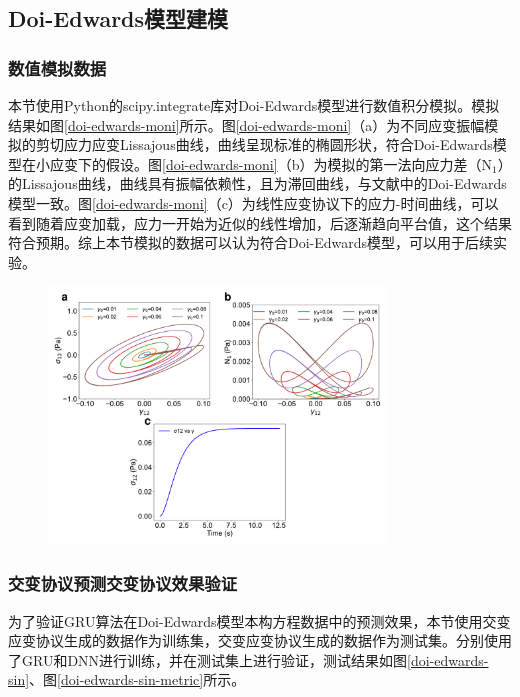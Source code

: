 \subsection{Doi-Edwards模型建模}
\subsubsection{数值模拟数据}
本节使用Python的scipy.integrate库对Doi-Edwards模型进行数值积分模拟。模拟结果如图\ref{doi-edwards-moni}所示。图\ref{doi-edwards-moni}（a）为不同应变振幅模拟的剪切应力应变Lissajous曲线，曲线呈现标准的椭圆形状，符合Doi-Edwards模型在小应变下的假设。图\ref{doi-edwards-moni}（b）为模拟的第一法向应力差（N$_1$）的Lissajous曲线，曲线具有振幅依赖性，且为滞回曲线，与文献中的Doi-Edwards模型一致。图\ref{doi-edwards-moni}（c）为线性应变协议下的应力-时间曲线，可以看到随着应变加载，应力一开始为近似的线性增加，后逐渐趋向平台值，这个结果符合预期。综上本节模拟的数据可以认为符合Doi-Edwards模型，可以用于后续实验。
\begin{figure}[htbp]
  \centering
  \includegraphics[width=0.8\textwidth]{Fig/doi-edwards-moni.pdf}
  \FigureBicaption{\label{doi-edwards-moni}}{}
\end{figure}
\subsubsection{交变协议预测交变协议效果验证}
为了验证GRU算法在Doi-Edwards模型本构方程数据中的预测效果，本节使用交变应变协议生成的数据作为训练集，交变应变协议生成的数据作为测试集。分别使用了GRU和DNN进行训练，并在测试集上进行验证，测试结果如图\ref{doi-edwards-sin}、图\ref{doi-edwards-sin-metric}所示。

